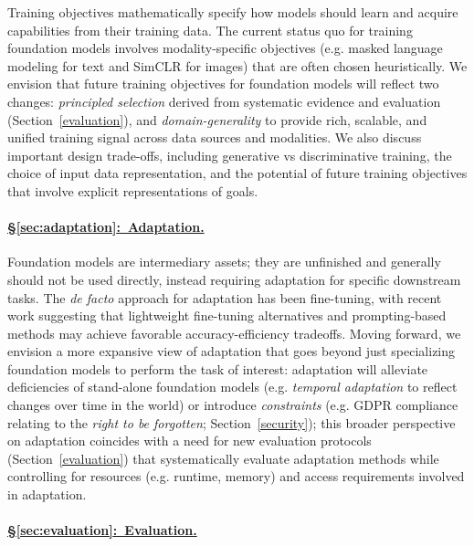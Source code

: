 Training objectives mathematically specify how models should learn and acquire capabilities from their training data. The current status quo for training foundation models involves modality-specific objectives (e.g. masked language modeling \citep{devlin2019bert} for text and SimCLR \citep{chen2020simclr} for images) that are often chosen heuristically. We envision that future training objectives for foundation models will reflect two changes: \textit{principled selection} derived from systematic evidence and evaluation (Section~\ref{evaluation}), and \textit{domain-generality} to provide rich, scalable, and unified training signal across data sources and modalities. We also discuss important design trade-offs, including generative vs discriminative training, the choice of input data representation, and the potential of future training objectives that involve explicit representations of goals.

\paragraph{\hyperref[sec:adaptation]{§\ref{sec:adaptation}:~Adaptation.}}

Foundation models are intermediary assets; they are unfinished and generally should not be used directly, instead requiring adaptation for specific downstream tasks. The \textit{de facto} approach for adaptation has been fine-tuning, with recent work suggesting that lightweight fine-tuning alternatives and prompting-based methods may achieve favorable accuracy-efficiency tradeoffs. Moving forward, we envision a more expansive view of adaptation that goes beyond just specializing foundation models to perform the task of interest: adaptation will alleviate deficiencies of stand-alone foundation models (e.g. \textit{temporal adaptation} to reflect changes over time in the world) or introduce \textit{constraints} (e.g. GDPR compliance relating to the \textit{right to be forgotten}; Section~\ref{security}); this broader perspective on adaptation coincides with a need for new evaluation protocols (Section~\ref{evaluation}) that systematically evaluate adaptation methods while controlling for resources (e.g. runtime, memory) and access requirements involved in adaptation.

\paragraph{\hyperref[sec:evaluation]{§\ref{sec:evaluation}:~Evaluation.}}

